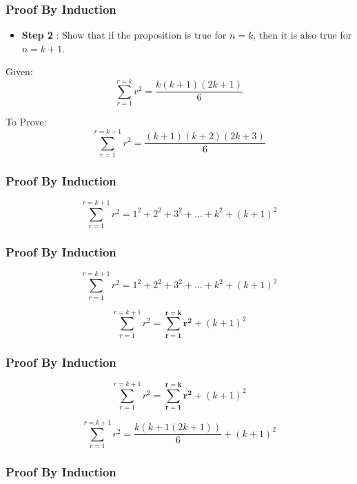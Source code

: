 \documentclass{beamer}
\begin{document}
\begin{frame}
\frametitle{Proof By Induction}
\vspace{-1cm}
\Large
\begin{itemize}
\item \textbf{Step 2} : Show that if the proposition is true for $n=k$, then it is also true for $n=k+1$.
\end{itemize}
Given: \[ \sum_{r=1}^{r=k} r^2 = \frac{k(k+1)(2k+1)}{6} \]

To Prove: \[ \sum_{r=1}^{r=k+1} r^2 = \frac{(k+1)(k+2)(2k+3)}{6} \]
\end{frame}

\begin{frame}
\frametitle{Proof By Induction}
\vspace{-1cm}
\Large


\[ \sum_{r=1}^{r=k+1} r^2 = 1^2 + 2^2 + 3^2 + \ldots + k^2 + (k+1)^2 \]



\end{frame}
\begin{frame}
\frametitle{Proof By Induction}
\vspace{-1cm}
\Large


\[ \sum_{r=1}^{r=k+1} r^2 = 1^2 + 2^2 + 3^2 + \ldots + k^2 + (k+1)^2 \]

\[ \sum_{r=1}^{r=k+1} r^2 = \boldsymbol{\sum_{r=1}^{r=k} r^2} + (k+1)^2 \]

\end{frame}
\begin{frame}
\frametitle{Proof By Induction}
\vspace{-1cm}
\Large
\[ \sum_{r=1}^{r=k+1} r^2 = \boldsymbol{\sum_{r=1}^{r=k} r^2} + (k+1)^2 \]

\[ \sum_{r=1}^{r=k+1} r^2 = \frac{k(k+1(2k+1
))}{6} + (k+1)^2 \]
\end{frame}
\begin{frame}
\frametitle{Proof By Induction}
\vspace{-1cm}
\Large


\end{frame}
\end{document}
